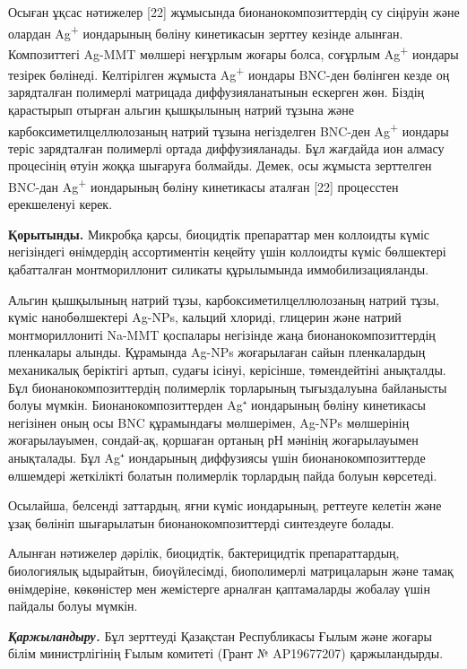 \begin{multicols}{2}
Осыған ұқсас нәтижелер {[}22{]} жұмысында бионанокомпозиттердің су
сіңіруін және олардан Ag\textsuperscript{+} иондарының бөліну
кинетикасын зерттеу кезінде алынған. Композиттегі Ag-MMT мөлшері
неғұрлым жоғары болса, соғұрлым Ag\textsuperscript{+} иондары тезірек
бөлінеді. Келтірілген жұмыста Ag\textsuperscript{+} иондары BNC-ден
бөлінген кезде оң зарядталған полимерлі матрицада диффузияланатынын
ескерген жөн. Біздің қарастырып отырған альгин қышқылының натрий тұзына
және карбоксиметилцеллюлозаның натрий тұзына негізделген BNC-ден
Ag\textsuperscript{+} иондары теріс зарядталған полимерлі ортада
диффузияланады. Бұл жағдайда ион алмасу процесінің өтуін жоққа шығаруға
болмайды. Демек, осы жұмыста зерттелген BNC-дан Ag\textsuperscript{+}
иондарының бөліну кинетикасы аталған {[}22{]} процесстен ерекшеленуі
керек.

{\bfseries Қорытынды.} Микробқа қарсы, биоцидтік препараттар мен коллоидты
күміс негізіндегі өнімдердің ассортиментін кеңейту үшін коллоидты күміс
бөлшектері қабатталған монтмориллонит силикаты құрылымында
иммобилизацияланды.

Альгин қышқылының натрий тұзы, карбоксиметилцеллюлозаның натрий тұзы,
күміс нанобөлшектері Ag-NPs, кальций хлориді, глицерин және натрий
монтмориллониті Na-MMT қоспалары негізінде жаңа бионанокомпозиттердің
пленкалары алынды. Құрамында Ag-NPs жоғарылаған сайын пленкалардың
механикалық беріктігі артып, судағы ісінуі, керісінше, төмендейтіні
анықталды. Бұл бионанокомпозиттердің полимерлік торларының тығыздалуына
байланысты болуы мүмкін. Бионанокомпозиттерден Ag⁺ иондарының бөліну
кинетикасы негізінен оның осы BNC құрамындағы мөлшерімен, Ag-NPs
мөлшерінің жоғарылауымен, сондай-ақ, қоршаған ортаның рН мәнінің
жоғарылауымен анықталады. Бұл Ag⁺ иондарының диффузиясы үшін
бионанокомпозиттерде өлшемдері жеткілікті болатын полимерлік торлардың
пайда болуын көрсетеді.

Осылайша, белсенді заттардың, яғни күміс иондарының, реттеуге келетін
және ұзақ бөлініп шығарылатын бионанокомпозиттерді синтездеуге болады.

Алынған нәтижелер дәрілік, биоцидтік, бактерицидтік препараттардың,
биологиялық ыдырайтын, биоүйлесімді, биополимерлі матрицаларын және
тамақ өнімдеріне, көкөністер мен жемістерге арналған қаптамаларды
жобалау үшін пайдалы болуы мүмкін.

\emph{{\bfseries Қаржыландыру.}} Бұл зерттеуді Қазақстан Республикасы Ғылым
және жоғары білім министрлігінің Ғылым комитеті (Грант № AP19677207)
қаржыландырды.
\end{multicols}

